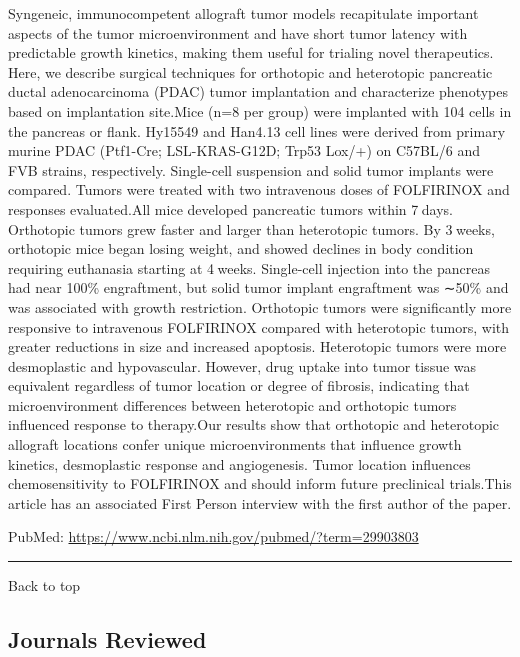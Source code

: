 \documentclass[]{article}
\begin{document}
Syngeneic, immunocompetent allograft tumor models recapitulate important
aspects of the tumor microenvironment and have short tumor latency with
predictable growth kinetics, making them useful for trialing novel
therapeutics. Here, we describe surgical techniques for orthotopic and
heterotopic pancreatic ductal adenocarcinoma (PDAC) tumor implantation
and characterize phenotypes based on implantation site.Mice (n=8 per
group) were implanted with 104 cells in the pancreas or flank. Hy15549
and Han4.13 cell lines were derived from primary murine PDAC (Ptf1-Cre;
LSL-KRAS-G12D; Trp53 Lox/+) on C57BL/6 and FVB strains, respectively.
Single-cell suspension and solid tumor implants were compared. Tumors
were treated with two intravenous doses of FOLFIRINOX and responses
evaluated.All mice developed pancreatic tumors within 7 days. Orthotopic
tumors grew faster and larger than heterotopic tumors. By 3 weeks,
orthotopic mice began losing weight, and showed declines in body
condition requiring euthanasia starting at 4 weeks. Single-cell
injection into the pancreas had near 100\% engraftment, but solid tumor
implant engraftment was ∼50\% and was associated with growth
restriction. Orthotopic tumors were significantly more responsive to
intravenous FOLFIRINOX compared with heterotopic tumors, with greater
reductions in size and increased apoptosis. Heterotopic tumors were more
desmoplastic and hypovascular. However, drug uptake into tumor tissue
was equivalent regardless of tumor location or degree of fibrosis,
indicating that microenvironment differences between heterotopic and
orthotopic tumors influenced response to therapy.Our results show that
orthotopic and heterotopic allograft locations confer unique
microenvironments that influence growth kinetics, desmoplastic response
and angiogenesis. Tumor location influences chemosensitivity to
FOLFIRINOX and should inform future preclinical trials.This article has
an associated First Person interview with the first author of the paper.

PubMed: \url{https://www.ncbi.nlm.nih.gov/pubmed/?term=29903803}

{}

{}

\begin{center}\rule{0.5\linewidth}{\linethickness}\end{center}

Back to top

\pagebreak

\hypertarget{journals-reviewed}{%
\subsection{Journals Reviewed}\label{journals-reviewed}}
\end{document}
